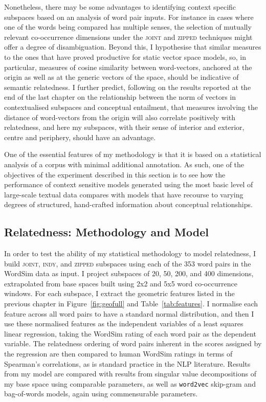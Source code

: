 Nonetheless, there may be some advantages to identifying context specific subspaces based on an analysis of word pair inputs.  For instance in cases where one of the words being compared has multiple senses, the selection of mutually relevant co-occurrence dimensions under the \textsc{joint} and \textsc{zipped} techniques might offer a degree of disambiguation.  Beyond this, I hypothesise that similar measures to the ones that have proved productive for static vector space models, so, in particular, measures of cosine similarity between word-vectors, anchored at the origin as well as at the generic vectors of the space, should be indicative of semantic relatedness.  I further predict, following on the results reported at the end of the last chapter on the relationship between the norm of vectors in contextualised subspaces and conceptual entailment, that measures involving the distance of word-vectors from the origin will also correlate positively with relatedness, and here my subspaces, with their sense of interior and exterior, centre and periphery, should have an advantage.

One of the essential features of my methodology is that it is based on a statistical analysis of a corpus with minimal additional annotation.  As such, one of the objectives of the experiment described in this section is to see how the performance of context sensitive models generated using the most basic level of large-scale textual data compares with models that have recourse to varying degrees of structured, hand-crafted information about conceptual relationships.

\subsection{Relatedness: Methodology and Model} \label{sec:relmeth}
In order to test the ability of my statistical methodology to model relatedness, I build \textsc{joint}, \textsc{indy}, and \textsc{zipped} subspaces using each of the 353 word pairs in the WordSim data as input.  I project subspaces of 20, 50, 200, and 400 dimensions, extrapolated from base spaces built using 2x2 and 5x5 word co-occurrence windows.  For each subspace, I extract the geometric features listed in the previous chapter in Figure~\ref{fig:geofull} and Table~\ref{tab:features}.  I normalise each feature across all word pairs to have a standard normal distribution, and then I use these normalised features as the independent variables of a least squares linear regression, taking the WordSim rating of each word pair as the dependent variable.  The relatedness ordering of word pairs inherent in the scores assigned by the regression are then compared to human WordSim ratings in terms of Spearman's correlations, as is standard practice in the NLP literature.  Results from my model are compared with results from singular value decompositions of my base space using comparable parameters, as well as \texttt{word2vec} skip-gram and bag-of-words models, again using commensurable parameters.

